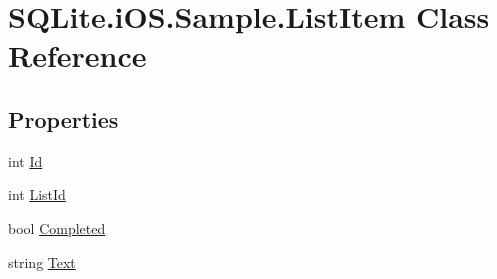 \hypertarget{class_s_q_lite_1_1i_o_s_1_1_sample_1_1_list_item}{\section{S\+Q\+Lite.\+i\+O\+S.\+Sample.\+List\+Item Class Reference}
\label{class_s_q_lite_1_1i_o_s_1_1_sample_1_1_list_item}
}
\subsection*{Properties}
\begin{DoxyCompactItemize}
\item 
int \hyperlink{class_s_q_lite_1_1i_o_s_1_1_sample_1_1_list_item_a1da2bbb81431579a2ef3052d0729df6e}{Id}
\item 
int \hyperlink{class_s_q_lite_1_1i_o_s_1_1_sample_1_1_list_item_a76ceeda4e846e58bfbda9409fcd9d34f}{List\+Id}
\item 
bool \hyperlink{class_s_q_lite_1_1i_o_s_1_1_sample_1_1_list_item_a8e9578bfaa2ab6fcf54e6b343408603d}{Completed}
\item 
string \hyperlink{class_s_q_lite_1_1i_o_s_1_1_sample_1_1_list_item_a3a3c892b53ce643b2862ca91b87bf4b7}{Text}
\end{DoxyCompactItemize}


